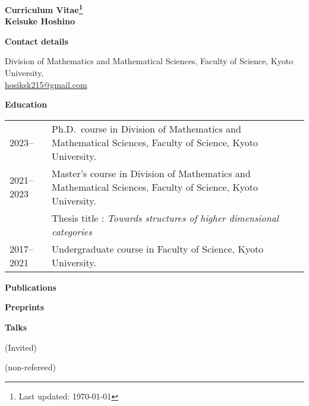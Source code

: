 \documentclass[a4paper,dvipsnames,11pt,backend=luatex]{article} %
\newcommand*{\cvsection}[1]{%
  \vspace{1.2\baselineskip}%
  {\raggedright          %
   \bfseries\large       %
   #1\par}               %
  \vspace{0.4\baselineskip}%
}
\begin{document}
\begin{center}\large\bfseries Curriculum Vitae\footnote{Last updated: \today}
\\
\rm Keisuke Hoshino
\end{center}
\noindent %
\cvsection{Contact details}
\vspace{-1em}%
\noindent %
Division of Mathematics and Mathematical Sciences, Faculty of Science, Kyoto University,
\\
\href{mailto:hosiksk215@gmail.com}{hosiksk215@gmail.com}


\cvsection{Education}
\begin{tabularx}{\textwidth}{@{}lp{140mm}}
  2023--
  &
  Ph.D.\ course in Division of Mathematics and Mathematical Sciences, Faculty of Science, Kyoto University.
  \\
  2021--2023
  &
  Master's course in Division of Mathematics and Mathematical Sciences, Faculty of Science, Kyoto University.
  \\&
  Thesis title : \textit{Towards structures of higher dimensional categories}
  \\
  2017--2021
  &
  Undergraduate course in Faculty of Science, Kyoto University.
\end{tabularx}

\cvsection{Publications}
\begin{refsection}                      %
  \nocite{*} %
  \printbibliography[heading=none,keyword=published,resetnumbers=true]
\end{refsection}

\cvsection{Preprints}
\begin{refsection}
\nocite{*} %
  \printbibliography[heading=none,keyword=preprint,resetnumbers=true]
\end{refsection}

\cvsection{Talks}
(Invited)
\begin{refsection}
\nocite{*} %
  \printbibliography[heading=none,keyword=iv-talk,resetnumbers=true]
\end{refsection}

(non-refereed)
\begin{refsection}
\nocite{*} %
  \printbibliography[heading=none,keyword=nr-talk,resetnumbers=true]
\end{refsection}
\end{document}
